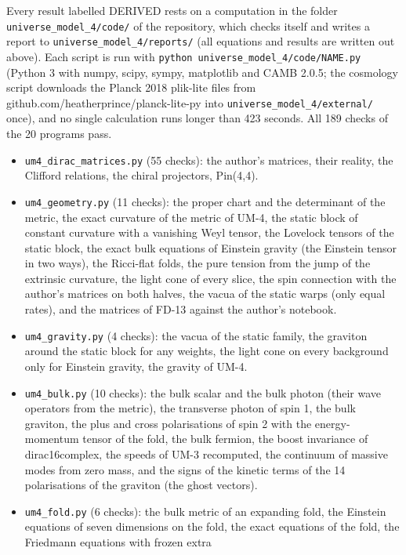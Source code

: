 \documentclass[
  10pt,
]{article}
\providecommand{\tightlist}{%
  \setlength{\itemsep}{0pt}\setlength{\parskip}{0pt}}
\begin{document}
Every result labelled DERIVED rests on a computation in the folder
\texttt{universe\_model\_4/code/} of the repository, which checks itself
and writes a report to \texttt{universe\_model\_4/reports/} (all
equations and results are written out above). Each script is run with
\texttt{python\ universe\_model\_4/code/NAME.py} (Python 3 with numpy,
scipy, sympy, matplotlib and CAMB 2.0.5; the cosmology script downloads
the Planck 2018 plik-lite files from
github.com/heatherprince/planck-lite-py into
\texttt{universe\_model\_4/external/} once), and no single calculation
runs longer than 423 seconds. All 189 checks of the 20 programs pass.

\begin{itemize}
\tightlist
\item
  \texttt{um4\_dirac\_matrices.py} (55 checks): the author's matrices,
  their reality, the Clifford relations, the chiral projectors,
  Pin(4,4).
\item
  \texttt{um4\_geometry.py} (11 checks): the proper chart and the
  determinant of the metric, the exact curvature of the metric of UM-4,
  the static block of constant curvature with a vanishing Weyl tensor,
  the Lovelock tensors of the static block, the exact bulk equations of
  Einstein gravity (the Einstein tensor in two ways), the Ricci-flat
  folds, the pure tension from the jump of the extrinsic curvature, the
  light cone of every slice, the spin connection with the author's
  matrices on both halves, the vacua of the static warps (only equal
  rates), and the matrices of FD-13 against the author's notebook.
\item
  \texttt{um4\_gravity.py} (4 checks): the vacua of the static family,
  the graviton around the static block for any weights, the light cone
  on every background only for Einstein gravity, the gravity of UM-4.
\item
  \texttt{um4\_bulk.py} (10 checks): the bulk scalar and the bulk photon
  (their wave operators from the metric), the transverse photon of spin
  1, the bulk graviton, the plus and cross polarisations of spin 2 with
  the energy-momentum tensor of the fold, the bulk fermion, the boost
  invariance of dirac16complex, the speeds of UM-3 recomputed, the
  continuum of massive modes from zero mass, and the signs of the
  kinetic terms of the 14 polarisations of the graviton (the ghost
  vectors).
\item
  \texttt{um4\_fold.py} (6 checks): the bulk metric of an expanding
  fold, the Einstein equations of seven dimensions on the fold, the
  exact equations of the fold, the Friedmann equations with frozen extra

\end{itemize}
\end{document}

